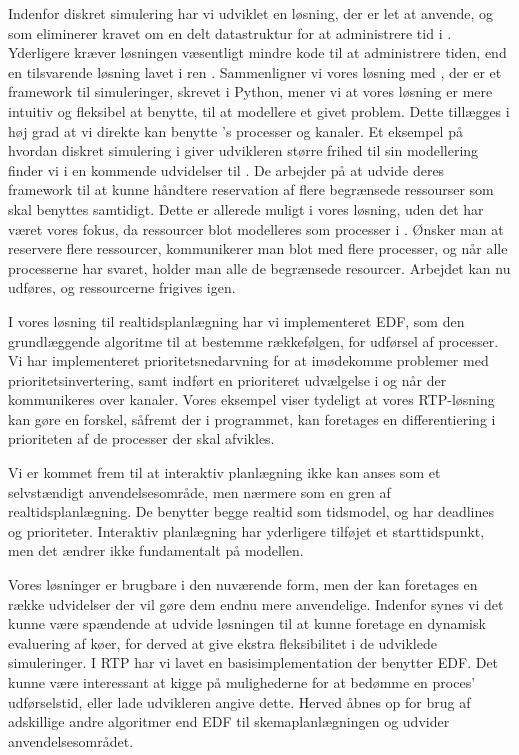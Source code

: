 Indenfor diskret simulering har vi udviklet en løsning, der er let at anvende, og som eliminerer kravet om en delt datastruktur for at administrere tid i \pycsp. Yderligere kræver løsningen væsentligt mindre kode til at administrere tiden, end en tilsvarende løsning lavet i ren \pycsp. 
Sammenligner vi vores løsning med \simpy, der er et framework til simuleringer, skrevet i Python, mener vi at vores løsning er mere intuitiv og fleksibel at benytte, til at modellere et givet problem. Dette tillægges i høj grad at vi direkte kan benytte \pycsp's processer og kanaler. Et eksempel på hvordan diskret simulering i \pycsp giver udvikleren større frihed til sin modellering finder vi i en kommende udvidelser til \simpy. De arbejder  på at udvide deres framework til at kunne håndtere reservation af flere begrænsede ressourser som skal benyttes samtidigt. Dette er allerede muligt i vores løsning, uden det har været vores fokus, da ressourcer blot modelleres som processer i \pycsp. Ønsker man at reservere flere ressourcer, kommunikerer man blot med flere processer, og når alle processerne har svaret, holder man alle de begrænsede resourcer. Arbejdet kan nu udføres, og ressourcerne frigives igen. 

I vores løsning til realtidsplanlægning har vi implementeret EDF, som den grundlæggende algoritme til at bestemme rækkefølgen, for udførsel af processer. Vi har implementeret prioritetsnedarvning for at imødekomme problemer med prioritetsinvertering, samt indført en prioriteret udvælgelse i  og når der kommunikeres over kanaler. Vores eksempel viser tydeligt at vores RTP-løsning kan gøre en forskel, såfremt der i programmet, kan foretages en differentiering i prioriteten af de processer der skal afvikles. 

Vi er kommet frem til at interaktiv planlægning ikke kan anses som et selvstændigt anvendelsesområde, men nærmere som en gren af realtidsplanlægning. De benytter begge realtid som tidsmodel, og har deadlines og prioriteter. Interaktiv planlægning har yderligere tilføjet et starttidspunkt, men det ændrer ikke fundamentalt på modellen. 

Vores løsninger er brugbare i den nuværende form, men der kan foretages en række udvidelser der vil gøre dem endnu mere anvendelige. 
Indenfor \des synes vi det kunne være spændende at udvide løsningen til at kunne foretage en dynamisk evaluering af køer, for derved at give ekstra fleksibilitet i de udviklede simuleringer. I RTP har vi lavet en basisimplementation der benytter EDF. Det kunne være interessant at kigge på mulighederne for at bedømme en proces' udførselstid, eller lade udvikleren angive dette.  Herved åbnes op for brug af adskillige andre algoritmer end EDF til skemaplanlægningen og udvider anvendelsesområdet.  







